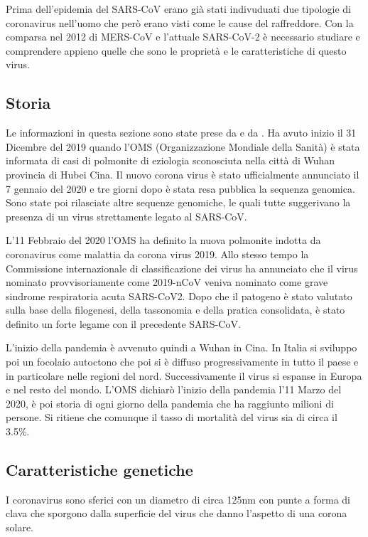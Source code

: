 Prima dell'epidemia del SARS-CoV erano già stati indivuduati due tipologie di coronavirus nell'uomo che però erano visti come le cause del raffreddore. Con la comparsa
nel 2012 di MERS-CoV e l'attuale SARS-CoV-2 è necessario studiare e comprendere appieno quelle che sono le proprietà e le caratteristiche di questo virus. 

\subsection{Storia}\label{subsec:es_subsec}
Le informazioni in questa sezione sono state prese da \cite{StoriaCovid} e da \cite{ReportCovid}.
Ha avuto inizio il 31 Dicembre del 2019 quando l'OMS (Organizzazione Mondiale della Sanità) è stata informata di casi di polmonite di eziologia sconosciuta nella città di Wuhan provincia di Hubei Cina. Il nuovo corona virus è stato ufficialmente annunciato il 7 gennaio del 2020 e tre giorni dopo è stata resa pubblica la sequenza genomica. Sono state poi rilasciate altre sequenze genomiche, le quali tutte suggerivano la presenza di un virus strettamente legato al SARS-CoV. 

L'11 Febbraio del 2020 l'OMS ha definito la nuova polmonite indotta da coronavirus come malattia da corona virus 2019. Allo stesso tempo la Commissione internazionale di classificazione dei virus ha annunciato che il virus nominato provvisoriamente come 2019-nCoV veniva nominato come grave sindrome respiratoria acuta SARS-CoV2. Dopo che il patogeno è stato valutato sulla base della filogenesi, della tassonomia e della pratica consolidata, è stato definito un forte legame con il precedente SARS-CoV. 

L'inizio della pandemia è avvenuto quindi a Wuhan in Cina. In Italia si sviluppo poi un focolaio autoctono che poi si è diffuso progressivamente in tutto il paese e in particolare nelle regioni del nord. Successivamente il virus si espanse in Europa e nel resto del mondo. L'OMS dichiarò l'inizio della pandemia l'11 Marzo del 2020, è poi storia di ogni giorno della pandemia che ha raggiunto milioni di persone. Si ritiene che comunque il tasso di mortalità del virus sia di circa il 3.5\%.  

\subsection{Caratteristiche genetiche}\label{subsec:es_subsec}
I coronavirus sono sferici con un diametro di circa 125nm con punte a forma di clava che sporgono dalla superficie del virus che danno l'aspetto di una corona solare. 


